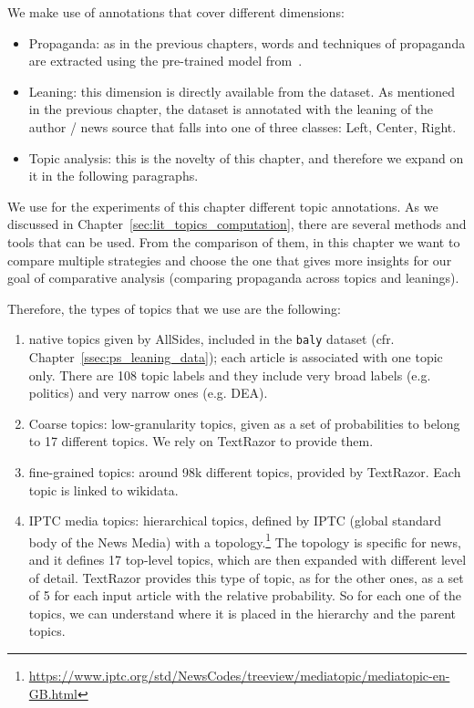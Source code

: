 We make use of annotations that cover different dimensions:
\begin{itemize}
    \item Propaganda: as in the previous chapters, words and techniques of propaganda are extracted using the pre-trained model from~\cite{da2019fine}.
    \item Leaning: this dimension is directly available from the dataset. As mentioned in the previous chapter, the dataset is annotated with the leaning of the author / news source that falls into one of three classes: Left, Center, Right.
    \item Topic analysis: this is the novelty of this chapter, and therefore we expand on it in the following paragraphs. %
\end{itemize}



We use for the experiments of this chapter different topic annotations. As we discussed in Chapter~\ref{sec:lit_topics_computation}, there are several methods and tools that can be used.
From the comparison of them, in this chapter we want to compare multiple strategies and choose the one that gives more insights for our goal of comparative analysis (comparing propaganda across topics and leanings).

Therefore, the types of topics that we use are the following:

\begin{enumerate}
    \item native topics given by AllSides, included in the \texttt{baly} dataset (cfr. Chapter~\ref{ssec:ps_leaning_data}); each article is associated with one topic only. There are 108 topic labels and they include very broad labels (e.g. politics) and very narrow ones (e.g. DEA).
    \item Coarse topics: low-granularity topics, given as a set of probabilities to belong to 17 different topics. We rely on TextRazor to provide them.
    \item fine-grained topics: around 98k different topics, provided by TextRazor. Each topic is linked to wikidata.
    \item IPTC media topics: hierarchical topics, defined by IPTC (global standard body of the News Media) with a topology.\footnote{\url{https://www.iptc.org/std/NewsCodes/treeview/mediatopic/mediatopic-en-GB.html}}
    The topology is specific for news, and it defines 17 top-level topics, which are then expanded with different level of detail. TextRazor provides this type of topic, as for the other ones, as a set of 5 for each input article with the relative probability. So for each one of the topics, we can understand where it is placed in the hierarchy and the parent topics.
\end{enumerate}


